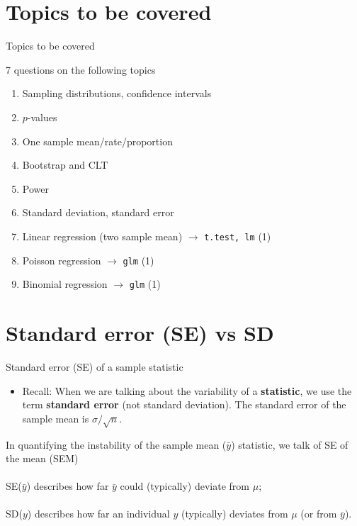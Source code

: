 \documentclass{beamer}\usepackage[]{graphicx}\usepackage[]{color}
\begin{document}
\section{Topics to be covered}

\begin{frame}{Topics to be covered}

7 questions on the following topics

\begin{enumerate}
	\setlength\itemsep{.51em}
	\item Sampling distributions, confidence intervals
	\item $p$-values 
	\item One sample mean/rate/proportion 
	\item Bootstrap and CLT
	\item Power
	\item Standard deviation, standard error
	\item Linear regression (two sample mean) $\to$ \texttt{t.test, lm} (1)
	\item Poisson regression $\to$ \texttt{glm} (1)
	\item Binomial regression $\to$ \texttt{glm} (1) 
\end{enumerate}

\end{frame}


\section{Standard error (SE) vs SD}



\begin{frame}{Standard error (SE) of a sample statistic}
\begin{itemize}
\item Recall: When we are talking about the variability of a
\textbf{statistic}, we use the term \textbf{standard error} (not
standard deviation). The standard error of the sample mean is $\sigma/\sqrt{n}$.
\end{itemize}


\begin{remarkm}[SE vs. SD]
\begin{center}
	In quantifying the instability of the sample mean ($\bar{y}$) statistic,
	we talk of SE of the mean (SEM) \\ \ \\
	SE($\bar{y}$) describes how far $\bar{y}$ could (typically) deviate from $\mu$; \\ \ \\
	SD($y$) describes how far an individual $y$ (typically) deviates from $\mu$ (or from $\bar{y}$).
\end{center}
\end{remarkm}	


\end{frame}
\end{document}
